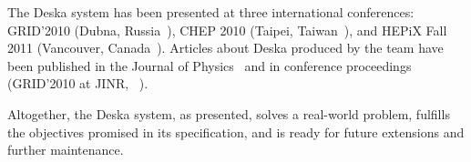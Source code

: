 \documentclass[deska]{subfiles}
\begin{document}
The Deska system has been presented at three international conferences: GRID'2010 (Dubna, Russia~\cite{dubna-kundrat}),
CHEP 2010 (Taipei, Taiwan~\cite{chep-2010-deska}), and HEPiX Fall 2011 (Vancouver, Canada~\cite{hepix-2011-deska}).
Articles about Deska produced by the team have been published in the Journal of Physics~\cite{jop-deska} and in
conference proceedings (GRID'2010 at JINR, ~\cite{dubna-deska-proceedings}).

Altogether, the Deska system, as presented, solves a real-world problem, fulfills the objectives promised in its
specification, and is ready for future extensions and further maintenance.
\end{document}
